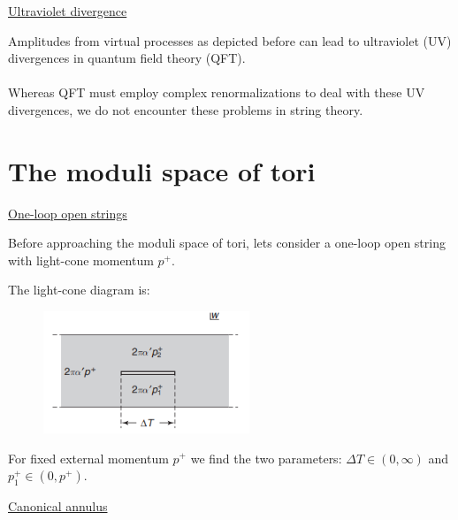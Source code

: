 \documentclass[11pt,aspectratio=169]{beamer}
\begin{document}
\begin{frame}{\underline{Ultraviolet divergence}}

	Amplitudes from virtual processes as depicted before can lead to ultraviolet (UV) divergences in quantum field theory (QFT).
	\\~\\
	Whereas QFT must employ complex renormalizations to deal with these UV divergences, we do not encounter these problems in string theory.
	
\end{frame}



\section{The moduli space of tori}

\begin{frame}[fragile]{\underline{One-loop open strings}}

	Before approaching the moduli space of tori, lets consider a one-loop open string with light-cone momentum $p^{+}$.

	The light-cone diagram is:
	\begin{figure}[htbp]
		\centering
		\includegraphics[width = 0.55\textwidth]{elements/one-loop open string.PNG}
	\end{figure}

	For fixed external momentum $p^+$ we find the two parameters: $\Delta T \in (0, \infty)$ and $p_{1}^{+} \in (0, p^+)$.


\end{frame}

\begin{frame}{\underline{Canonical annulus}}

	
	
\end{frame}
\end{document}
